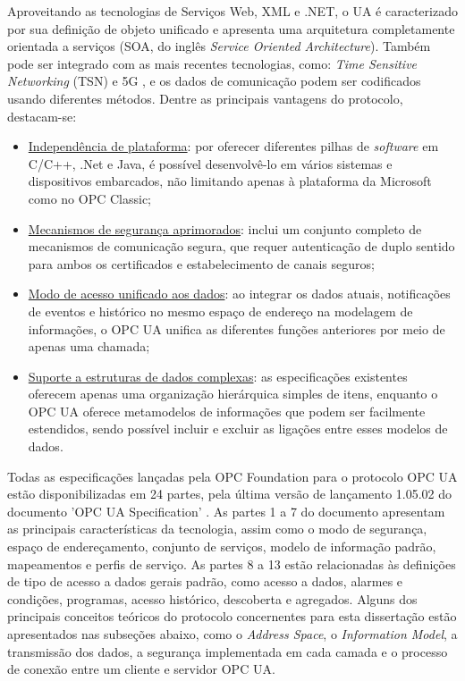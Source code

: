         Aproveitando as tecnologias de Serviços Web, XML e .NET, o UA é caracterizado por sua definição de objeto unificado e apresenta uma arquitetura completamente orientada a serviços (SOA, do inglês \textit{Service Oriented Architecture}). Também pode ser integrado com as mais recentes tecnologias, como: \textit{Time Sensitive Networking} (TSN) e 5G \cite{han2022}, e os dados de comunicação podem ser codificados usando diferentes métodos. Dentre as principais vantagens do protocolo, destacam-se:
        
        \begin{itemize}
            \item \underline{Independência de plataforma}: por oferecer diferentes pilhas de \textit{software} em C/C++, .Net e Java, é possível desenvolvê-lo em vários sistemas e dispositivos embarcados, não limitando apenas à plataforma da Microsoft como no OPC Classic;
            \item \underline{Mecanismos de segurança aprimorados}: inclui um conjunto completo de mecanismos de comunicação segura, que requer autenticação de duplo sentido para ambos os certificados e estabelecimento de canais seguros;
            \item \underline{Modo de acesso unificado aos dados}: ao integrar os dados atuais, notificações de eventos e histórico no mesmo espaço de endereço na modelagem de informações, o OPC UA unifica as diferentes funções anteriores por meio de apenas uma chamada;
            \item \underline{Suporte a estruturas de dados complexas}: as especificações existentes oferecem apenas uma organização hierárquica simples de itens, enquanto o OPC UA oferece metamodelos de informações que podem ser facilmente estendidos, sendo possível incluir e excluir as ligações entre esses modelos de dados.
        \end{itemize}
        
        Todas as especificações lançadas pela OPC Foundation para o protocolo OPC UA estão disponibilizadas em 24 partes, pela última versão de lançamento 1.05.02 do documento 'OPC UA Specification' \cite{opc2022}. As partes 1 a 7 do documento apresentam as principais características da tecnologia, assim como o modo de segurança, espaço de endereçamento, conjunto de serviços, modelo de informação padrão, mapeamentos e perfis de serviço. As partes 8 a 13 estão relacionadas às definições de tipo de acesso a dados gerais padrão, como acesso a dados, alarmes e condições, programas, acesso histórico, descoberta e agregados. Alguns dos principais conceitos teóricos do protocolo concernentes para esta dissertação estão apresentados nas subseções abaixo, como o \textit{Address Space}, o \textit{Information Model}, a transmissão dos dados, a segurança implementada em cada camada e o processo de conexão entre um cliente e servidor OPC UA.
    
